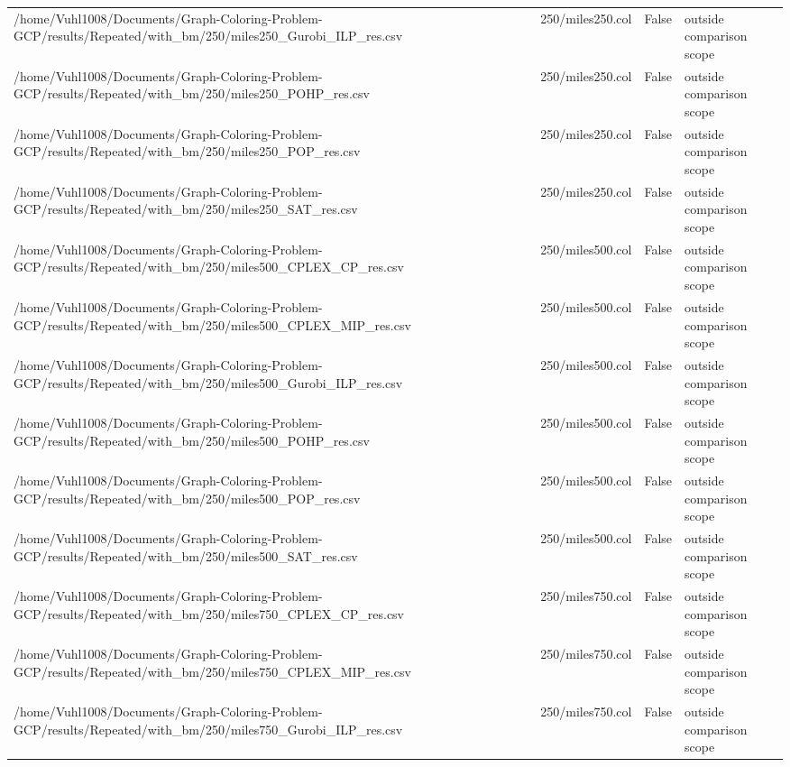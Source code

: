 \begin{table}[htbp]
\begin{tabular}{llll}
/home/Vuhl1008/Documents/Graph-Coloring-Problem-GCP/results/Repeated/with\_bm/250/miles250\_Gurobi\_ILP\_res.csv & 250/miles250.col & False & outside comparison scope \\
/home/Vuhl1008/Documents/Graph-Coloring-Problem-GCP/results/Repeated/with\_bm/250/miles250\_POHP\_res.csv & 250/miles250.col & False & outside comparison scope \\
/home/Vuhl1008/Documents/Graph-Coloring-Problem-GCP/results/Repeated/with\_bm/250/miles250\_POP\_res.csv & 250/miles250.col & False & outside comparison scope \\
/home/Vuhl1008/Documents/Graph-Coloring-Problem-GCP/results/Repeated/with\_bm/250/miles250\_SAT\_res.csv & 250/miles250.col & False & outside comparison scope \\
/home/Vuhl1008/Documents/Graph-Coloring-Problem-GCP/results/Repeated/with\_bm/250/miles500\_CPLEX\_CP\_res.csv & 250/miles500.col & False & outside comparison scope \\
/home/Vuhl1008/Documents/Graph-Coloring-Problem-GCP/results/Repeated/with\_bm/250/miles500\_CPLEX\_MIP\_res.csv & 250/miles500.col & False & outside comparison scope \\
/home/Vuhl1008/Documents/Graph-Coloring-Problem-GCP/results/Repeated/with\_bm/250/miles500\_Gurobi\_ILP\_res.csv & 250/miles500.col & False & outside comparison scope \\
/home/Vuhl1008/Documents/Graph-Coloring-Problem-GCP/results/Repeated/with\_bm/250/miles500\_POHP\_res.csv & 250/miles500.col & False & outside comparison scope \\
/home/Vuhl1008/Documents/Graph-Coloring-Problem-GCP/results/Repeated/with\_bm/250/miles500\_POP\_res.csv & 250/miles500.col & False & outside comparison scope \\
/home/Vuhl1008/Documents/Graph-Coloring-Problem-GCP/results/Repeated/with\_bm/250/miles500\_SAT\_res.csv & 250/miles500.col & False & outside comparison scope \\
/home/Vuhl1008/Documents/Graph-Coloring-Problem-GCP/results/Repeated/with\_bm/250/miles750\_CPLEX\_CP\_res.csv & 250/miles750.col & False & outside comparison scope \\
/home/Vuhl1008/Documents/Graph-Coloring-Problem-GCP/results/Repeated/with\_bm/250/miles750\_CPLEX\_MIP\_res.csv & 250/miles750.col & False & outside comparison scope \\
/home/Vuhl1008/Documents/Graph-Coloring-Problem-GCP/results/Repeated/with\_bm/250/miles750\_Gurobi\_ILP\_res.csv & 250/miles750.col & False & outside comparison scope \\

\end{tabular}
\end{table}
